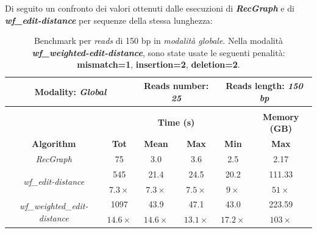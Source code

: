     Di seguito un confronto dei valori ottenuti dalle esecuzioni di \textbf{\textit{RecGraph}} e di \textbf{\textit{wf\_edit-distance}} per sequenze della stessa lunghezza:

\vspace{20pt}
    \begin{table}[h]
        \centering
        \begin{tabular}{|c|c|c|c|c|c|}
            \hline
                \multicolumn{2}{|c|}{\textbf{Modality:} \emph{Global}} & \multicolumn{2}{|c|}{\textbf{Reads number: } \emph{25}} & \multicolumn{2}{|c|}{\textbf{Reads length:} \emph{150 bp}} \\
            \hline
                \multicolumn{6}{|c|}{} \\
            \hline
                & \multicolumn{4}{|c|}{\textbf{Time (s)}} & \textbf{Memory (GB)} \\
            \hline
                \textbf{Algorithm} & \textbf{Tot} & \textbf{Mean} & \textbf{Max} & \textbf{Min} & \textbf{Max} \\
            \hline
                \emph{RecGraph} & 75 & 3.0 & 3.6 & 2.5 & 2.17 \\
            \hline
                \multirow{2}{*}{\emph{wf\_edit-distance}} & 545 & 21.4 & 24.5 & 20.2 & 111.33 \\
                & $7.3 \times$ & $7.3 \times$ & $7.5 \times$ & $9 \times$ & $51 \times$ \\
            \hline
            \multirow{2}{*}{\emph{wf\_weighted\_edit-distance}} & 1097 & 43.9 & 47.1 & 43.0 & 223.59 \\
                & $14.6 \times$ & $14.6 \times$ & $13.1 \times$ & $17.2 \times$ & $103 \times$ \\
            \hline
        \end{tabular}
        \caption{Benchmark per \emph{reads} di 150 bp in \emph{modalità globale}. Nella modalità \textbf{\textit{wf\_weighted-edit-distance}}, sono state usate le seguenti penalità: \textbf{mismatch=1}, \textbf{insertion=2}, \textbf{deletion=2}.}
        \label{tab:benchmark_global_150}
    \end{table}
    \vspace{20pt}
    
